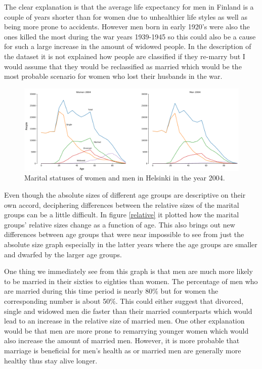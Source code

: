 \documentclass{article}
\begin{document}
The clear explanation is that the average life expectancy for men in Finland is a couple of years shorter than for women due to unhealthier life styles as well as being more prone to accidents. However men born in early 1920's were also the ones killed the most during the war years 1939-1945 so this could also be a cause for such a large increase in the amount of widowed people. In the description of the dataset it is not explained how people are classified if they re-marry but I would assume that they would be reclassified as married which would be the most probable scenario for women who lost their husbands in the war.

 
 
\begin{figure}[h!]
\centering
\includegraphics[width = \linewidth]{absolute}
\caption{Marital statuses of women and men in Helsinki in the year 2004.}
\label{absolute}
\end{figure}

Even though the absolute sizes of different age groups are descriptive on their own accord, deciphering differences between the relative sizes of the marital groups can be a little difficult. In figure \ref{relative} it plotted how the marital groups' relative sizes change as a function of age. This also brings out new differences between age groups that were near impossible to see from just the absolute size graph especially in the latter years where the age groups are smaller and dwarfed by the larger age groups. 


One thing we immediately see from this graph is that men are much more likely to be married in their sixties to eighties than women. The percentage of men who are married during this time period is  nearly 80\% but for women the corresponding number is about 50\%. This could either suggest that divorced, single and widowed men die faster than their married counterparts which would lead to an increase in the relative size of married men. One other explanation would be that men are more prone to remarrying younger women which would also increase the amount of married men. However, it is more probable that marriage is beneficial for men's health as or married men are generally more healthy thus stay alive longer. 
\end{document}
